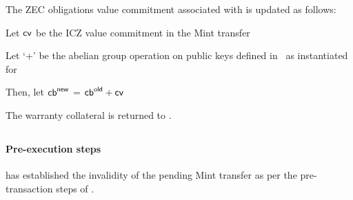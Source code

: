 The ZEC obligations value commitment \cb associated with \vault is updated as follows:
\begin{alg}
    \item Let $\mathsf{cv}$ be the ICZ value commitment in the Mint transfer
    \item Let `+' be the abelian group operation on public keys defined in~\cite[Section 4.1.6.2]{hopwood2016zcash} as instantiated for \redjj
    \item Then, let $\mathsf{cb}^{\mathsf{new}}$ = $\mathsf{cb}^{\mathsf{old}} + \mathsf{cv}$
\end{alg}

The warranty collateral \iw is returned to \issuer.

\subsection{\challengeIssueop}

\paragraph{Pre-execution steps}
\vault has established the invalidity of the pending Mint transfer as per the pre-transaction steps of \confirmIssueop.

